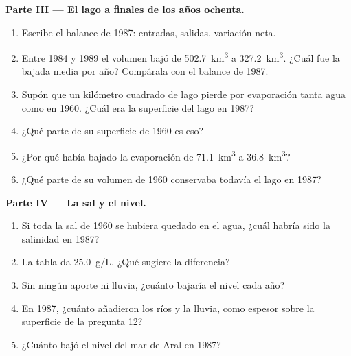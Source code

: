 \begin{problem}
\medskip
\noindent\textbf{Parte III --- El lago a finales de los años ochenta.}
\begin{enumerate}[resume]
  \item Escribe el balance de 1987: entradas, salidas, variación neta.
  \item Entre 1984 y 1989 el volumen bajó de \qty{502.7}{km^3} a
        \qty{327.2}{km^3}. ¿Cuál fue la bajada media por año? Compárala con
        el balance de 1987.
  \item Supón que un kilómetro cuadrado de lago pierde por evaporación tanta
        agua como en 1960. ¿Cuál era la superficie del lago en 1987?
  \item ¿Qué parte de su superficie de 1960 es eso?
  \item ¿Por qué había bajado la evaporación de \qty{71.1}{km^3} a
        \qty{36.8}{km^3}?
  \item ¿Qué parte de su volumen de 1960 conservaba todavía el lago en 1987?
\end{enumerate}

\medskip
\noindent\textbf{Parte IV --- La sal y el nivel.}
\begin{enumerate}[resume]
  \item Si toda la sal de 1960 se hubiera quedado en el agua, ¿cuál habría
        sido la salinidad en 1987?
  \item La tabla da \qty{25.0}{g/L}. ¿Qué sugiere la diferencia?
  \item Sin ningún aporte ni lluvia, ¿cuánto bajaría el nivel cada año?
  \item En 1987, ¿cuánto añadieron los ríos y la lluvia, como espesor sobre la
        superficie de la pregunta 12?
  \item ¿Cuánto bajó el nivel del mar de Aral en 1987?
\end{enumerate}
\end{problem}

